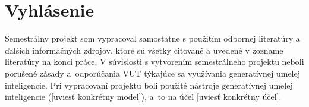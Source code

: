 \chapter*{Vyhlásenie}

Semestrálny projekt som vypracoval samostatne s použitím odbornej literatúry a ďalších informačných zdrojov, ktoré sú všetky citované a uvedené v zozname literatúry na konci práce. V súvislosti s vytvorením semestrálneho projektu neboli porušené zásady a~odporúčania VUT týkajúce sa využívania generatívnej umelej inteligencie. Pri vypracovaní projektu boli použité nástroje generatívnej umelej inteligencie ([uviesť konkrétny model]), a~to na účel [uviesť konkrétny účel].
